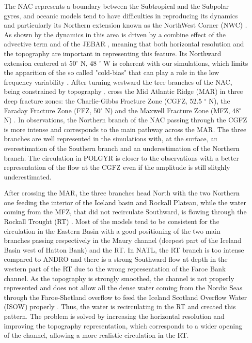 \documentclass[11pt,a4paper]{article}
\begin{document}
The NAC represents a boundary between the Subtropical and the Subpolar gyres, and oceanic models tend to have difficulties in reproducing its dynamics and particularly its  Northern extension known as the NorthWest Corner (NWC) \citep{bryan2007,hecht2008,drews2015}. As shown by \citet{wang2017} the dynamics in this area is driven by a combine effect of the advective term and of the JEBAR \citep{mertz1992}, meaning that both horizontal resolution and the topography are important in representing this feature. Its Northward extension centered at 50$^{\circ}$ N, 48 $^{\circ}$ W \citep{lazier1994} is coherent with our simulations, which limits the apparition of the so called "cold-bias" that can play a role in the low frequency variability \citep{drews2017}. After turning westward the tree branches of the NAC, being constrained by topography \citep{bower2008}, cross the Mid Atlantic Ridge (MAR) in three deep fracture zones: the Charlie-Gibbs Fracture Zone (CGFZ, 52.5 $^{\circ}$ N), the Faraday Fracture Zone (FFZ, 50$^{\circ}$ N) and the Maxwell Fracture Zone (MFZ, 48$^{\circ}$ N) \citep{bower2002}. In observations, the Northern branch of the NAC passing through the CGFZ is more intense and corresponds to the main pathway across the MAR. The three branches are well represented in the simulations with, at the surface, an overestimation of the Southern branch and an underestimation of the Northern branch. The circulation in POLGYR is closer to the observations with a better representation of the flow at the CGFZ even if the amplitude is still slitghly underestimated. 

After crossing the MAR, the three branches head North with the two Northern one feeding the interior of the Iceland basin and Rockall Plateau, while the water coming from the MFZ, that did not recirculate Southward, is flowing through the Rockall Trought (RT) \citep{daniault2016}. Most of the models tend to be consistent for the circulation in the Eastern Basin \citep{treguier2005,deshayes2007} with a good positioning of the two main branches passing respectively in the Maury channel (deepest part of the Iceland Basin west of Hatton Bank) and the RT. In NATL, the RT branch is too intense compared to ANDRO and there is a strong Southward flow at depth in the western part of the RT due to the wrong representation of the Faroe Bank channel. As the topography is strongly smoothed, the channel is not properly represented and does not allow all the dense water coming from the Nordic Seas through the Faroe-Shetland overflow to feed the Iceland Scotland Overflow Water (ISOW) properly \citep{hansen2016,kanzow2014}. Thus, the water is recirculating in the RT and created this pattern. The problem is solved by increasing the horizontal resolution and improving the topography representation, which corresponds to a wider opening of the channel, allowing a more realistic circulation in the RT. 
\end{document}
